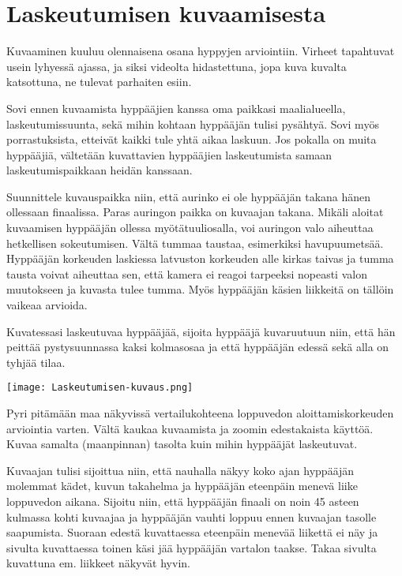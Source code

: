 \section{ Laskeutumisen kuvaamisesta }
\label{kuvunkasittelyharjoitukset-laskeutumisen-kuvaamisesta}


Kuvaaminen kuuluu olennaisena osana hyppyjen arviointiin. Virheet tapahtuvat usein lyhyessä ajassa, ja siksi videolta hidastettuna, jopa kuva kuvalta katsottuna, ne tulevat parhaiten esiin. 


Sovi ennen kuvaamista hyppääjien kanssa oma paikkasi maalialueella, laskeutumissuunta, sekä mihin kohtaan hyppääjän tulisi pysähtyä. Sovi myös porrastuksista, etteivät kaikki tule yhtä aikaa laskuun. Jos pokalla on muita hyppääjiä, vältetään kuvattavien hyppääjien laskeutumista samaan laskeutumispaikkaan heidän kanssaan. 


Suunnittele kuvauspaikka niin, että aurinko ei ole hyppääjän takana hänen ollessaan finaalissa. Paras auringon paikka on kuvaajan takana. Mikäli aloitat kuvaamisen hyppääjän ollessa myötätuuliosalla, voi auringon valo aiheuttaa hetkellisen sokeutumisen. Vältä tummaa taustaa, esimerkiksi havupuumetsää. Hyppääjän korkeuden laskiessa latvuston korkeuden alle kirkas taivas ja tumma tausta voivat aiheuttaa sen, että kamera ei reagoi tarpeeksi nopeasti valon muutokseen ja kuvasta tulee tumma. Myös hyppääjän käsien liikkeitä on tällöin vaikeaa arvioida. 


Kuvatessasi laskeutuvaa hyppääjää, sijoita hyppääjä kuvaruutuun niin, että hän peittää pystysuunnassa kaksi kolmasosaa ja että hyppääjän edessä sekä alla on tyhjää tilaa. 


\begin{Figure}\centering\texttt{[image: Laskeutumisen-kuvaus.png]}\end{Figure} 


Pyri pitämään maa näkyvissä vertailukohteena loppuvedon aloittamiskorkeuden arviointia varten. Vältä kaukaa kuvaamista ja zoomin edestakaista käyttöä. Kuvaa samalta (maanpinnan) tasolta kuin mihin hyppääjät laskeutuvat. 


Kuvaajan tulisi sijoittua niin, että nauhalla näkyy koko ajan hyppääjän molemmat kädet, kuvun takahelma ja hyppääjän eteenpäin menevä liike loppuvedon aikana. Sijoitu niin, että hyppääjän finaali on noin 45 asteen kulmassa kohti kuvaajaa ja hyppääjän vauhti loppuu ennen kuvaajan tasolle saapumista. Suoraan edestä kuvattaessa eteenpäin menevää liikettä ei näy ja sivulta kuvattaessa toinen käsi jää hyppääjän vartalon taakse. Takaa sivulta kuvattuna em. liikkeet näkyvät hyvin. 


